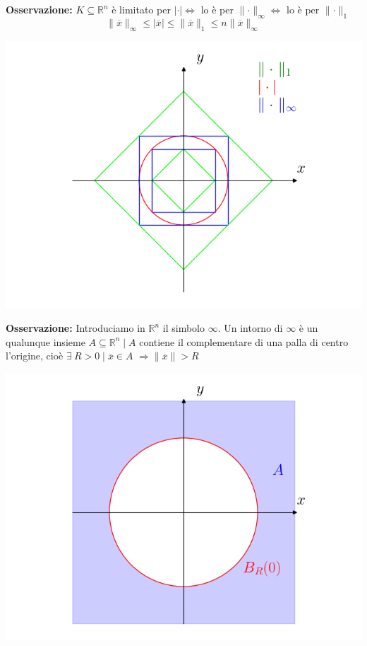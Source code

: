 \textbf{Osservazione:}
$K \subseteq \mathbb{R}^n$ è limitato per $|\cdot| \iff$ lo è per $\parallel \cdot \parallel_\infty \iff$ lo è per $\parallel \cdot \parallel_1$
\begin{equation*}
	\parallel \overline{x} \parallel_\infty \leq |\overline{x}| \leq \parallel \overline{x} \parallel_1 \leq n \parallel \overline{x} \parallel_\infty
\end{equation*}


\begin{center}
	\label{fig:pag166_1}
	\includegraphics[width=0.7\linewidth]{spazi_metrici_e_normati/pag166_1}
\end{center}


\textbf{Osservazione:}
Introduciamo in $\mathbb{R}^n$ il simbolo $\infty$. Un intorno di $\infty$ è un qualunque insieme $A \subseteq \mathbb{R}^n \; \big| \; A$ contiene il complementare di una palla di centro l'origine, cioè $\exists \ R > 0 \; \big| \; \overline{x} \in A$ $\Rightarrow \parallel \overline{x} \parallel > R$
\begin{center}
	\includegraphics[width=0.7\linewidth]{spazi_metrici_e_normati/pag166_2}
	\label{fig:pag1662}
\end{center}

